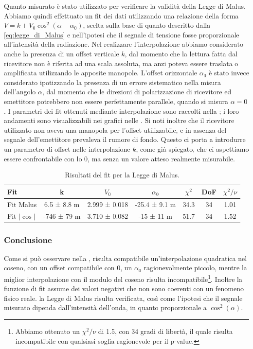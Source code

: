 \documentclass[a4paper]{article}
\begin{document}
Quanto misurato è stato utilizzato per verificare la validità della Legge di Malus. 
Abbiamo quindi effettuato un fit dei dati utilizzando una relazione della forma $V = k+V_0\cos^2(\alpha - \alpha_0)$, 
scelta sulla base di quanto descritto dalla \cref{eq:legge_di_Malus} e nell'ipotesi che il segnale di tensione fosse proporzionale all'intensità della radiazione. 
Nel realizzare l'interpolazione abbiamo considerato anche la presenza di un offset verticale $k$, dal momento che la lettura fatta dal ricevitore non è riferita ad una scala assoluta, 
ma anzi poteva essere traslata o amplificata utilizzando le apposite manopole. 
L'offset orizzontale $\alpha_0$ è stato invece considerato ipotizzando la presenza di un errore sistematico nella misura dell'angolo $\alpha$,
dal momento che le direzioni di polarizzazione di ricevitore ed emettitore potrebbero non essere perfettamente parallele, quando si misura $\alpha = 0$.
I parametri dei fit ottenuti mediante interpolazione sono raccolti nella ; i loro andamenti sono visualizzabili nei grafici nelle . Si noti inoltre che il ricevitore utilizzato non aveva una manopola per l'offset utilizzabile, e in assenza del segnale dell'emettitore prevaleva il rumore di fondo. Questo ci porta a introdurre un parametro di offset nelle interpolazione $k$, come già spiegato, che ci aspettiamo essere confrontabile con lo 0, ma senza un valore atteso realmente misurabile.
\begin{table}[htbp]
\centering
\begin{tabular}{|l|cccccc|}
\hline
Fit & k & $V_0$ & $\alpha_0$ & $\chi^2$ & DoF & $\chi^2/\nu$ \\\hline\hline
Fit Malus & 6.5 ± 8.8 m & 2.999 ± 0.018 & -25.4 ± 9.1 m & 34.3 & 34 & 1.01 \\\hline
Fit $|\cos|$ & -746 ± 79 m & 3.710 ± 0.082 & -15 ± 11 m & 51.7 & 34 & 1.52 \\\hline
\end{tabular}
\caption{Risultati del fit per la Legge di Malus.}
\label{tab:fit_Malus}
\end{table}

\subsubsection{Conclusione}
Come si può osservare nella , risulta compatibile un'interpolazione quadratica nel coseno, con un offset compatibile con 0, un $\alpha_0$ ragionevolmente piccolo, mentre la miglior interpolazione con il modulo del coseno risulta incompatibile\footnote{ Abbiamo ottenuto un $\chi^2/\nu$ di 1.5, con 34 gradi di libertà, il quale risulta incompatibile con qualsiasi soglia ragionevole per il p-value.}. Inoltre la funzione di fit assume dei valori negativi che non sono coerenti con un fenomeno fisico reale. la Legge di Malus risulta verificata, così come l'ipotesi che il segnale misurato dipenda dall'intensità dell'onda, in quanto proporzionale a $\cos^2(\alpha)$.
\end{document}

